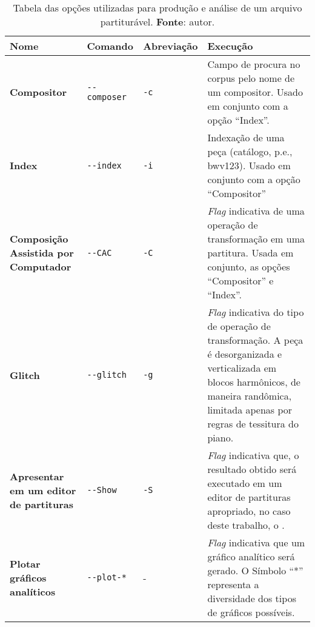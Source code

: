 \begin{table}
\caption{Tabela das opções utilizadas para produção e análise de um arquivo partiturável. \textbf{Fonte}: autor.}
\small
    \begin{tabular}{| p{3cm} | p{3cm} | p{2.25cm} | p{5.75cm} |}
    \hline 
    \hline 

    \textbf{Nome} & 
    \textbf{Comando} &
    \textbf{Abreviação} &
    \textbf{Execução}\\

    \hline

    \textbf{Compositor} 
    & \verb|--composer|
    & \verb|-c|             
    & Campo de procura no corpus pelo nome de um compositor. Usado em conjunto com a opção ``Index''. \\
    \hline

    \textbf{Index} 
    & \verb|--index|    
    & \verb|-i|             
    & Indexação de uma peça (catálogo, p.e., bwv123). Usado em conjunto com a opção ``Compositor'' \\
    \hline

    \textbf{Composição Assistida por Computador} 
    & \verb|--CAC|  
    & \verb|-C|             
    & \emph{Flag} indicativa de uma operação de transformação em uma partitura. Usada em conjunto, as opções ``Compositor'' e ``Index''.\\
    \hline

     \textbf{Glitch} 
    & \verb|--glitch|      
    & \verb|-g|              
    & \emph{Flag} indicativa do tipo de operação de transformação. A peça é desorganizada e verticalizada em blocos harmônicos, de maneira randômica, limitada apenas por regras de tessitura do piano. \\
    \hline

    \textbf{Apresentar em um editor de partituras} 
    & \verb|--Show|       
    & \verb|-S|             
    & \emph{Flag} indicativa que, o resultado obtido será executado em um editor de partituras apropriado, no caso deste trabalho, o \cite{musescore_2015}.\\
    \hline
    
    \textbf{Plotar gráficos analíticos} 
    & \verb|--plot-*|       
    & -                                          
    & \emph{Flag} indicativa que um gráfico analítico será gerado. O Símbolo ``*'' representa a diversidade dos tipos de gráficos possíveis. \\
    \hline
    \hline
   
    \end{tabular}
\label{tab:comandos}
\end{table}